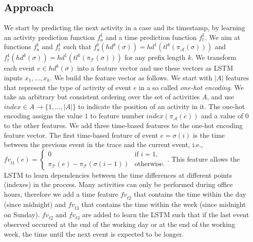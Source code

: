 \documentclass[runningheads,a4paper]{llncs}
\begin{document}
\subsection{Approach}
We start by predicting the next activity in a case and its timestamp, by learning an activity prediction function $f_a^1$ and a time prediction function $f_t^1$. We aim at functions $f_a^1$ and $f_t^1$ such that
$f_a^1(\mathit{hd}^k(\sigma))=\mathit{hd}^1(\mathit{tl}^k(\pi_\mathcal{A}(\sigma)))$ and $f_t^1(\mathit{hd}^k(\sigma))=\mathit{hd}^1(\mathit{tl}^k(\pi_\mathcal{T}(\sigma)))$ for any prefix length $k$.
We transform each event $e \in \mathit{hd}^k(\sigma)$ into a feature vector and use these vectors as LSTM inputs $x_1, \dots, x_k$. We build the feature vector as follows. We start with $|A|$ features that represent the type of activity of event $e$ in a so called \emph{one-hot encoding}. We take an arbitrary but consistent ordering over the set of activities $A$, and use $index\in A\rightarrow \{1,\dots,|A|\}$ to indicate the position of an activity in it. The one-hot encoding assigns the value $1$ to feature number $\mathit{index}(\pi_\mathcal{A}(e))$ and a value of $0$ to the other features. We add three time-based features to the one-hot encoding feature vector. The first time-based feature of event $e=\sigma(i)$ is the time between the previous event in the trace and the current event, i.e., $\mathit{fv}_{t1}(e)= \left\{
\begin{array}{ll}
	0  & \mbox{if } i=1, \\
	\pi_\mathcal{T}(e) - \pi_\mathcal{T}(\sigma(i-1)) & \mbox{otherwise}.
\end{array}
\right.$. This feature allows the LSTM to learn dependencies between the time differences at different points (indexes) in the process. Many activities can only be performed during office hours, therefore we add a time feature $\mathit{fv}_{t2}$ that contains the time within the day (since midnight) and $\mathit{fv}_{t3}$ that contains the time within the week (since midnight on Sunday). $\mathit{fv}_{t2}$ and $\mathit{fv}_{t3}$ are added to learn the LSTM such that if the last event observed occurred at the end of the working day or at the end of the working week, the time until the next event is expected to be longer.
\end{document}
